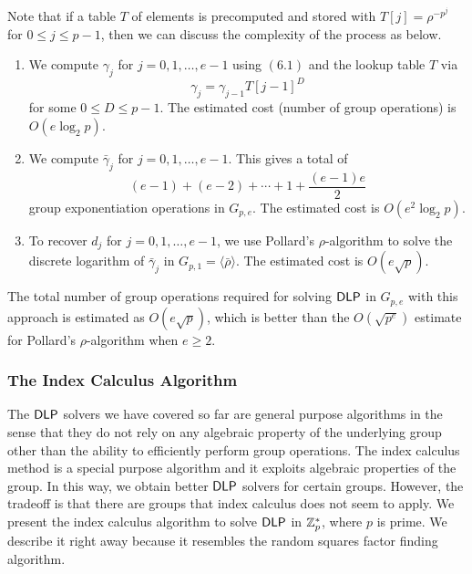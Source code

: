 Note that if a table $T$ of elements is precomputed and stored with $T[j] 
= \rho^{-p^j}$ for $0 \leq j \leq p-1$, then we can discuss the complexity of 
the process as below. 
\begin{enumerate}
      \item We compute $\gamma_j$ for $j = 0, 1, \dots, e-1$ using $(6.1)$ 
            and the lookup table $T$ via 
            \[ \gamma_j = \gamma_{j-1} T[j-1]^D \] 
            for some $0 \leq D \leq p-1$. The estimated cost (number of group 
            operations) is $O(e\log_2 p)$. 
      \item We compute $\bar\gamma_j$ for $j = 0, 1, \dots, e-1$. This gives a 
            total of 
            \[ (e-1) + (e-2) + \cdots + 1 + \frac{(e-1)e}2 \] 
            group exponentiation operations in $G_{p,e}$. The estimated cost is 
            $O(e^2\log_2 p)$. 
      \item To recover $d_j$ for $j = 0, 1, \dots, e-1$, we use Pollard's 
            $\rho$-algorithm to solve the discrete logarithm of $\bar\gamma_j$ 
            in $G_{p,1} = \langle \bar\rho \rangle$. The estimated cost is 
            $O(e\sqrt p)$. 
\end{enumerate}
The total number of group operations required for solving ${\sf DLP}$ in $G_{p,e}$ 
with this approach is estimated as $O(e\sqrt p)$, which is better than the 
$O(\sqrt{p^e})$ estimate for Pollard's $\rho$-algorithm when $e \geq 2$. 

\subsubsection{The Index Calculus Algorithm}
The ${\sf DLP}$ solvers we have covered so far are general purpose algorithms in the 
sense that they do not rely on any algebraic property of the underlying group 
other than the ability to efficiently perform group operations. The index calculus 
method is a special purpose algorithm and it exploits algebraic properties of the 
group. In this way, we obtain better ${\sf DLP}$ solvers for certain groups. However, 
the tradeoff is that there are groups that index calculus does not seem to apply.
We present the index calculus algorithm to solve ${\sf DLP}$ in $\mathbb{Z}_p^*$, where 
$p$ is prime. We describe it right away because it resembles the 
random squares factor finding algorithm. 

